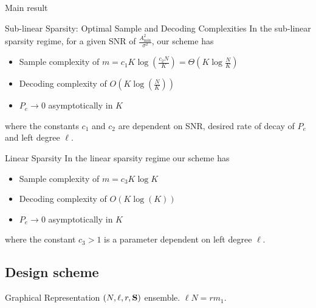 \begin{frame}{Main result}
\begin{block}{Sub-linear Sparsity: Optimal Sample and Decoding Complexities}
In the sub-linear sparsity regime, for a given SNR of $\frac{A^{2}_{\text{min}}}{\sigma^{2}}$, our scheme has 
\begin{itemize}
\item Sample complexity of $m=c_1 K\log (\frac{c_2 N}{K})=\Theta(K\log \frac{N}{K})$
\item Decoding complexity of $O\left(K\log(\frac{N}{K})\right)$ 
\item $P_e\rightarrow 0$ asymptotically in $K$
\end{itemize} 
where the constants $c_{1}$ and $c_{2}$ are dependent on SNR, desired rate of decay of $P_e$ and left degree $\ell$.
\end{block}
\begin{block}{Linear Sparsity}
In the linear sparsity regime our scheme has 
\begin{itemize}
\item Sample complexity of $m=c_3 K\log K$
\item Decoding complexity of $O\left(K\log(K)\right)$ 
\item $P_e\rightarrow 0$ asymptotically in $K$
\end{itemize} 
where the constant $c_{3}>1$ is a parameter dependent on left degree $\ell$.
\end{block}
\end{frame}

\subsection{Design scheme}
\begin{frame}{Graphical Representation}
$(N,\ell,r,\mathbf{S})$ ensemble. $\ell N=rm_1$. 
\begin{figure}
\scalebox{1.3}{}
\end{figure}
\end{frame}

